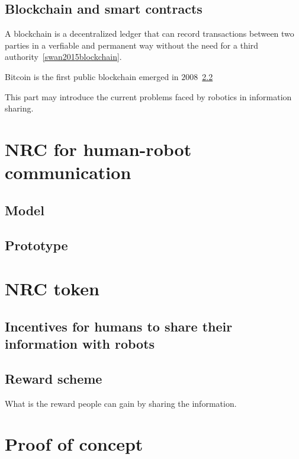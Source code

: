 \documentclass{article}
\begin{document}




\subsection{Blockchain and smart contracts}
\label{subsec:blockchain}

A blockchain is a decentralized ledger that can record
transactions between two parties in a verfiable and permanent
way without the need for a third authority~\cref{swan2015blockchain}.

Bitcoin is the first public blockchain emerged in $2008$~\cref{}

This part may introduce the current problems faced by robotics in information sharing.


\section{NRC for human-robot communication}
\label{sec:nrc}

\subsection{Model}
\label{subsec:model}

\subsection{Prototype}
\label{subsec:prototype}


\section{NRC token}

\subsection{Incentives for humans to share their information 
    with robots}



\subsection{Reward scheme}
What is the reward people can gain by sharing the information.


\section{Proof of concept}
\label{sec:proof-concept}
\end{document}
